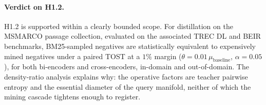 \paragraph{Verdict on H1.2.} H1.2 is supported within a clearly bounded scope. For distillation on the MSMARCO passage collection, evaluated on the associated TREC DL and BEIR benchmarks, BM25-sampled negatives are statistically equivalent to expensively mined negatives under a paired TOST at a $1\%$ margin ($\theta = 0.01\,\mu_{\text{baseline}}$, $\alpha = 0.05$), for both bi-encoders and cross-encoders, in-domain and out-of-domain. The density-ratio analysis explains why: the operative factors are teacher pairwise entropy and the essential diameter of the query manifold, neither of which the mining cascade tightens enough to register.
